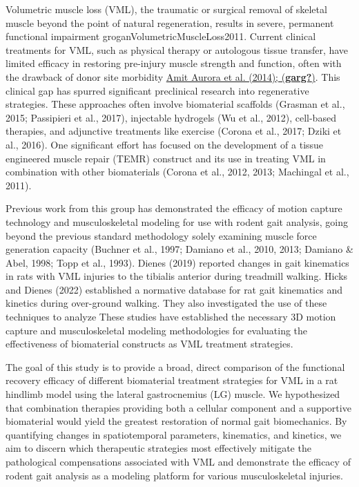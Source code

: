 \documentclass[
]{agujournal2019}
\begin{document}
Volumetric muscle loss (VML), the traumatic or surgical removal of
skeletal muscle beyond the point of natural regeneration, results in
severe, permanent functional impairment groganVolumetricMuscleLoss2011.
Current clinical treatments for VML, such as physical therapy or
autologous tissue transfer, have limited efficacy in restoring
pre-injury muscle strength and function, often with the drawback of
donor site morbidity \href{Garg\%20et\%20al.,\%202015}{Amit Aurora et
al. (2014); (\textbf{garg?})}. This clinical gap has spurred significant
preclinical research into regenerative strategies. These approaches
often involve biomaterial scaffolds (Grasman et al., 2015; Passipieri et
al., 2017), injectable hydrogels (Wu et al., 2012), cell-based
therapies, and adjunctive treatments like exercise (Corona et al., 2017;
Dziki et al., 2016). One significant effort has focused on the
development of a tissue engineered muscle repair (TEMR) construct and
its use in treating VML in combination with other biomaterials (Corona
et al., 2012, 2013; Machingal et al., 2011).

Previous work from this group has demonstrated the efficacy of motion
capture technology and musculoskeletal modeling for use with rodent gait
analysis, going beyond the previous standard methodology solely
examining muscle force generation capacity (Buchner et al., 1997;
Damiano et al., 2010, 2013; Damiano \& Abel, 1998; Topp et al., 1993).
Dienes (2019) reported changes in gait kinematics in rats with VML
injuries to the tibialis anterior during treadmill walking. Hicks and
Dienes (2022) established a normative database for rat gait kinematics
and kinetics during over-ground walking. They also investigated the use
of these techniques to analyze These studies have established the
necessary 3D motion capture and musculoskeletal modeling methodologies
for evaluating the effectiveness of biomaterial constructs as VML
treatment strategies.

The goal of this study is to provide a broad, direct comparison of the
functional recovery efficacy of different biomaterial treatment
strategies for VML in a rat hindlimb model using the lateral
gastrocnemius (LG) muscle. We hypothesized that combination therapies
providing both a cellular component and a supportive biomaterial would
yield the greatest restoration of normal gait biomechanics. By
quantifying changes in spatiotemporal parameters, kinematics, and
kinetics, we aim to discern which therapeutic strategies most
effectively mitigate the pathological compensations associated with VML
and demonstrate the efficacy of rodent gait analysis as a modeling
platform for various musculoskeletal injuries.
\end{document}
